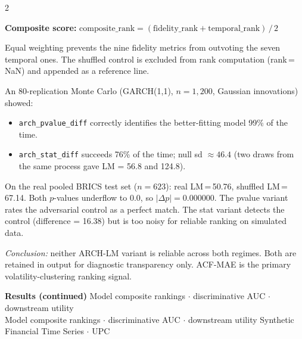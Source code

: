 \documentclass[10pt]{article}
\newcommand{\navybox}[2]{\begin{tcolorbox}[mybox={Navy}{LBg},title={#1}]#2\end{tcolorbox}}
\newcommand{\pagehead}[2]{%
  \begin{tcolorbox}[enhanced,arc=0pt,outer arc=0pt,boxrule=0pt,
    colback=Navy,colframe=Navy,
    top=5pt,bottom=5pt,left=8pt,right=8pt,
    before skip=0pt,after skip=10pt]
  {\color{white}\large\bfseries #1}%
  \ifx\relax#2\relax\else\\[1pt]{\color{blue!30!white}\small #2}\fi
  \hfill{\color{blue!20!white}\footnotesize Synthetic Financial Time Series $\cdot$ UPC}
  \end{tcolorbox}}
\begin{document}
\begin{multicols}{2}
{\textbf{Composite score:}
$\text{composite\_rank} = (\text{fidelity\_rank} + \text{temporal\_rank})\,/\,2$

Equal weighting prevents the nine fidelity metrics from outvoting the seven temporal ones. The shuffled control is excluded from rank computation (rank\,=\,NaN) and appended as a reference line.}

\navybox{ARCH-LM Regime Failure}{%
An 80-replication Monte Carlo (GARCH(1,1), $n=1{,}200$, Gaussian innovations) showed:
\begin{itemize}
  \item \texttt{arch\_pvalue\_diff} correctly identifies the better-fitting model 99\% of the time.
  \item \texttt{arch\_stat\_diff} succeeds 76\% of the time; null sd $\approx 46.4$ (two draws from the same process gave LM = 56.8 and 124.8).
\end{itemize}
On the real pooled BRICS test set ($n=623$): real LM\,=\,50.76, shuffled LM\,=\,67.14. Both $p$-values underflow to 0.0, so $|\Delta p| = 0.000000$. The pvalue variant rates the adversarial control as a perfect match. The stat variant detects the control (difference = 16.38) but is too noisy for reliable ranking on simulated data.

\textit{Conclusion:} neither ARCH-LM variant is reliable across both regimes. Both are retained in output for diagnostic transparency only. ACF-MAE is the primary volatility-clustering ranking signal.}

\end{multicols}

\clearpage

\pagehead{Results (continued)}
         {Model composite rankings $\cdot$ discriminative AUC $\cdot$ downstream utility}
\end{document}
